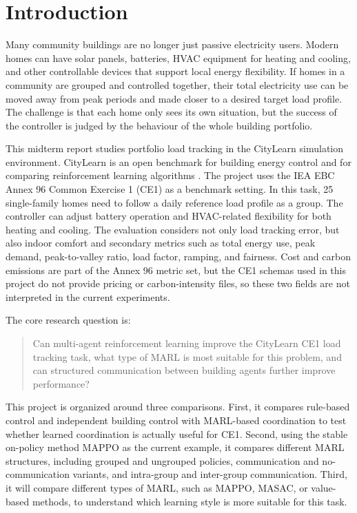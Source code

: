 ﻿\chapter{Introduction}\label{ch:intro}

Many community buildings are no longer just passive electricity users. Modern
homes can have solar panels, batteries, HVAC equipment for heating and cooling,
and other controllable devices that support local energy flexibility.
If homes in a community are grouped and controlled together, their total
electricity use can be moved away from peak periods and made closer to a
desired target load profile. The challenge is that each home only sees its own
situation, but the success of the controller is judged by the behaviour of the
whole building portfolio.

This midterm report studies portfolio load tracking in the CityLearn simulation
environment. CityLearn is an open benchmark for building energy control and for
comparing reinforcement learning algorithms
\cite{citylearn2019,citylearn2020,citylearnv2}. The project uses the IEA EBC
Annex 96 Common Exercise 1 (CE1) as a benchmark setting. In this
task, 25 single-family homes need to follow a daily reference load profile as a
group. The controller can adjust battery operation and HVAC-related flexibility
for both heating and cooling. The evaluation considers not only load tracking
error, but also indoor comfort and secondary metrics such as total energy use,
peak demand, peak-to-valley ratio, load factor, ramping, and fairness. Cost and
carbon emissions are part of the Annex 96 metric set, but the CE1 schemas used
in this project do not provide pricing or carbon-intensity files, so these two
fields are not interpreted in the current experiments.

The core research question is:

\begin{quote}
Can multi-agent reinforcement learning improve the CityLearn CE1 load tracking
task, what type of MARL is most suitable for this problem, and can structured
communication between building agents further improve performance?
\end{quote}

This project is organized around three comparisons. First, it compares
rule-based control and independent building control with MARL-based coordination
to test whether learned coordination is actually useful for CE1. Second, using
the stable on-policy method MAPPO as the current example, it compares different
MARL structures, including grouped and ungrouped policies, communication and
no-communication variants, and intra-group and inter-group communication. Third,
it will compare different types of MARL, such as MAPPO, MASAC, or value-based
methods, to understand which learning style is more suitable for this task.

